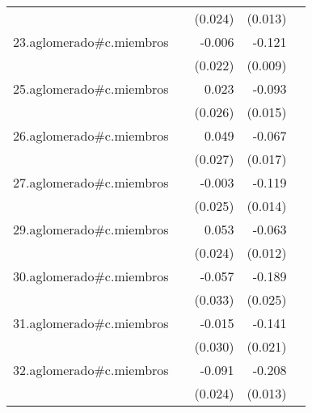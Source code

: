 {\begin{longtable}{l*{4}{D{.}{.}{-1}}}
            &                     &     (0.024)         &     (0.013)         &                     \\
\addlinespace
23.aglomerado#c.miembros&                     &      -0.006         &      -0.121\sym{***}&                     \\
            &                     &     (0.022)         &     (0.009)         &                     \\
\addlinespace
25.aglomerado#c.miembros&                     &       0.023         &      -0.093\sym{***}&                     \\
            &                     &     (0.026)         &     (0.015)         &                     \\
\addlinespace
26.aglomerado#c.miembros&                     &       0.049         &      -0.067\sym{***}&                     \\
            &                     &     (0.027)         &     (0.017)         &                     \\
\addlinespace
27.aglomerado#c.miembros&                     &      -0.003         &      -0.119\sym{***}&                     \\
            &                     &     (0.025)         &     (0.014)         &                     \\
\addlinespace
29.aglomerado#c.miembros&                     &       0.053\sym{*}  &      -0.063\sym{***}&                     \\
            &                     &     (0.024)         &     (0.012)         &                     \\
\addlinespace
30.aglomerado#c.miembros&                     &      -0.057         &      -0.189\sym{***}&                     \\
            &                     &     (0.033)         &     (0.025)         &                     \\
\addlinespace
31.aglomerado#c.miembros&                     &      -0.015         &      -0.141\sym{***}&                     \\
            &                     &     (0.030)         &     (0.021)         &                     \\
\addlinespace
32.aglomerado#c.miembros&                     &      -0.091\sym{***}&      -0.208\sym{***}&                     \\
            &                     &     (0.024)         &     (0.013)         &                     \\

\end{longtable}}

